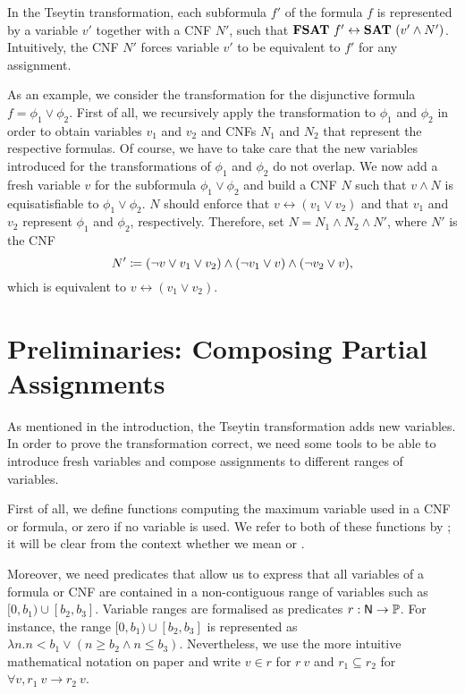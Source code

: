 In the Tseytin transformation, each subformula $f'$ of the formula $f$ is represented by a variable $v'$ together with a CNF $N'$, such that $\textbf{FSAT}{}~f' \leftrightarrow \textbf{SAT}{}~(v' \land N')$. Intuitively, the CNF $N'$ forces variable $v'$ to be equivalent to $f'$ for any assignment.
\begin{example}
  As an example, we consider the transformation for the disjunctive formula $f = \phi_1 \lor \phi_2$. First of all, we recursively apply the transformation to $\phi_1$ and $\phi_2$ in order to obtain variables $v_1$ and $v_2$ and CNFs $N_1$ and $N_2$ that represent the respective formulas. Of course, we have to take care that the new variables introduced for the transformations of $\phi_1$ and $\phi_2$ do not overlap.
  We now add a fresh variable $v$ for the subformula $\phi_1 \lor \phi_2$ and build a CNF $N$ such that $v \land N$ is equisatisfiable to $\phi_1 \lor \phi_2$. $N$ should enforce that $v \leftrightarrow (v_1 \lor v_2)$ and that $v_1$ and $v_2$ represent $\phi_1$ and $\phi_2$, respectively.
  Therefore, set $N = N_1 \land N_2 \land N'$, where $N'$ is the CNF 
  \[ N' \coloneqq (\lnot v \lor v_1 \lor v_2) \land (\lnot v_1  \lor v) \land (\lnot v_2 \lor v), \]
  which is equivalent to $v \leftrightarrow (v_1 \lor v_2)$.
\end{example}

\section{Preliminaries: Composing Partial Assignments}\label{sec:tseytin_prelim}
As mentioned in the introduction, the Tseytin transformation adds new variables. In order to prove the transformation correct, we need some tools to be able to introduce fresh variables and compose assignments to different ranges of variables.

First of all, we define functions computing the maximum variable used in a CNF or formula, or zero if no variable is used. We refer to both of these functions by \mnotec{\maxVar{}}; it will be clear from the context whether we mean 
%
or . 

\newcommand{\inlit}{\ensuremath{\in_{\textsf{lit}}}}
\newcommand{\inclause}{\ensuremath{\in_{\textsf{clause}}}}
\newcommand{\incnf}{\ensuremath{\in_{\textsf{cnf}}}}
\newcommand{\infor}{\ensuremath{\in_{\formula}}}
Moreover, we need predicates that allow us to express that all variables of a formula
or CNF are contained in a non-contiguous range of variables such as $[0, b_1) \cup [b_2, b_3]$. 
Variable ranges are formalised as predicates $r : \mathsf{N} \rightarrow \mathbb{P}$. For instance, the range $[0, b_1) \cup [b_2, b_3]$ is represented as $\lambda n. n < b_1 \lor (n \ge b_2 \land n \le b_3)$. Nevertheless, we use the more intuitive mathematical notation on paper and write $v \in r$ for $r~v$ and $r_1 \subseteq r_2$ for $\forall v, r_1~v \rightarrow r_2~v$.

